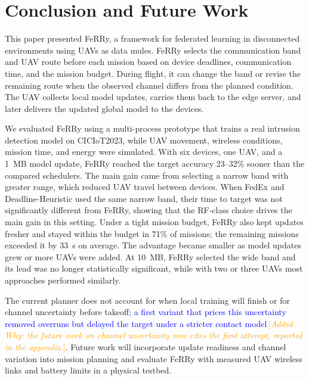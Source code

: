 \documentclass[conference]{IEEEtran}
\newcommand{\sysname}{FeRRy}
\newcommand{\changenote}[1]{\textcolor{orange}{\,[\emph{#1}]}}
\begin{document}
\section{Conclusion and Future Work}
\label{sec:conclusion}

This paper presented \sysname{}, a framework for federated learning in
disconnected environments using UAVs as data mules. \sysname{} selects the
communication band and UAV route before each mission based on device deadlines,
communication time, and the mission budget. During flight, it can change the
band or revise the remaining route when the observed channel differs from the
planned condition. The UAV collects local model updates, carries them back to
the edge server, and later delivers the updated global model to the devices.

We evaluated \sysname{} using a multi-process prototype that trains a real
intrusion detection model on CICIoT2023, while UAV movement, wireless
conditions, mission time, and energy were simulated. With six devices, one UAV,
and a 1~MB model update, \sysname{} reached the target accuracy 23--32\% sooner
than the compared schedulers. The main gain came from selecting a narrow band
with greater range, which reduced UAV travel between devices. When FedEx and
Deadline-Heuristic used the same narrow band, their time to target was not
significantly different from \sysname{}, showing that the RF-class choice
drives the main gain in this setting. Under a tight mission budget, \sysname{}
also kept updates fresher and stayed within the budget in 71\% of missions; the
remaining missions exceeded it by 33~s on average. The advantage became smaller
as model updates grew or more UAVs were added. At 10~MB, \sysname{} selected
the wide band and its lead was no longer statistically significant, while with
two or three UAVs most approaches performed similarly.

The current planner does not account for when local training will finish or for
channel uncertainty before takeoff\textcolor{blue}{; a first variant that prices
this uncertainty removed overruns but delayed the target under a stricter
contact model}\changenote{Added. Why: the future work on channel uncertainty now cites the first attempt, reported in the appendix.}. Future work will incorporate update readiness and channel
variation into mission planning and evaluate \sysname{} with measured UAV
wireless links and battery limits in a physical testbed.

\end{document}
